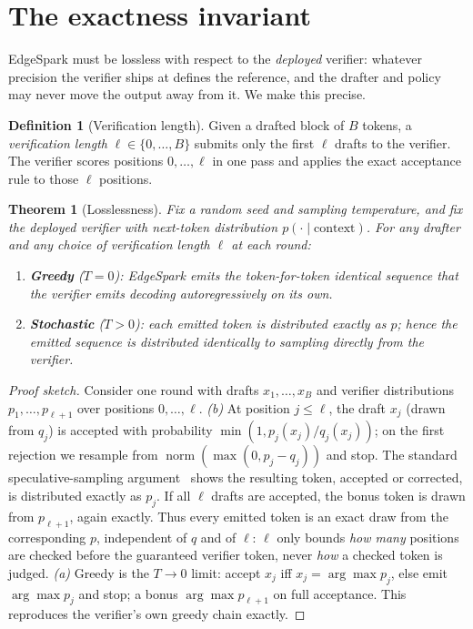 \documentclass[11pt]{article}
\theoremstyle{plain}
\newtheorem{theorem}{Theorem}
\theoremstyle{definition}
\newtheorem{definition}{Definition}
\begin{document}
\section{The exactness invariant}
\label{sec:exactness}
EdgeSpark must be lossless with respect to the \emph{deployed} verifier: whatever
precision the verifier ships at defines the reference, and the drafter and policy
may never move the output away from it. We make this precise.

\begin{definition}[Verification length]
Given a drafted block of $B$ tokens, a \emph{verification length}
$\ell \in \{0,\dots,B\}$ submits only the first $\ell$ drafts to the verifier.
The verifier scores positions $0,\dots,\ell$ in one pass and applies the exact
acceptance rule to those $\ell$ positions.
\end{definition}

\begin{theorem}[Losslessness]
\label{thm:exact}
Fix a random seed and sampling temperature, and fix the deployed verifier with
next-token distribution $p(\cdot \mid \text{context})$. For \emph{any} drafter
and \emph{any} choice of verification length $\ell$ at each round:
\begin{enumerate}\itemsep1pt
\item[(a)] \textbf{Greedy} ($T{=}0$): EdgeSpark emits the token-for-token
identical sequence that the verifier emits decoding autoregressively on its own.
\item[(b)] \textbf{Stochastic} ($T{>}0$): each emitted token is distributed
exactly as $p$; hence the emitted sequence is distributed identically to
sampling directly from the verifier.
\end{enumerate}
\end{theorem}

\begin{proof}[Proof sketch]
Consider one round with drafts $x_1,\dots,x_B$ and verifier distributions
$p_1,\dots,p_{\ell+1}$ over positions $0,\dots,\ell$.
\emph{(b)} At position $j\le\ell$, the draft $x_j$ (drawn from $q_j$) is accepted
with probability $\min(1, p_j(x_j)/q_j(x_j))$; on the first rejection we resample
from $\operatorname{norm}(\max(0, p_j - q_j))$ and stop. The standard
speculative-sampling argument~\citep[App.~A.1]{leviathan2023} shows the resulting
token, accepted or corrected, is distributed exactly as $p_j$. If all $\ell$
drafts are accepted, the bonus token is drawn from $p_{\ell+1}$, again exactly.
Thus every emitted token is an exact draw from the corresponding $p$, independent
of $q$ and of $\ell$: $\ell$ only bounds \emph{how many} positions are checked
before the guaranteed verifier token, never \emph{how} a checked token is judged.
\emph{(a)} Greedy is the $T\to 0$ limit: accept $x_j$ iff $x_j=\arg\max p_j$, else
emit $\arg\max p_j$ and stop; a bonus $\arg\max p_{\ell+1}$ on full acceptance.
This reproduces the verifier's own greedy chain exactly.
\end{proof}
\end{document}
